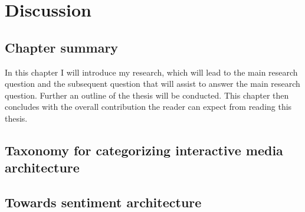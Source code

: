 \chapter{Discussion}
\label{chapterlabel6}

\section*{Chapter summary}

In this chapter I will introduce my research, which will lead to the main research question and the subsequent question that will assist to answer the main research question. Further an outline of the thesis will be conducted. This chapter then concludes with the overall contribution the reader can expect from reading this thesis.\newpage


\section{Taxonomy for categorizing interactive media architecture}

\blindtext

\section{Towards sentiment architecture}

\blindtext